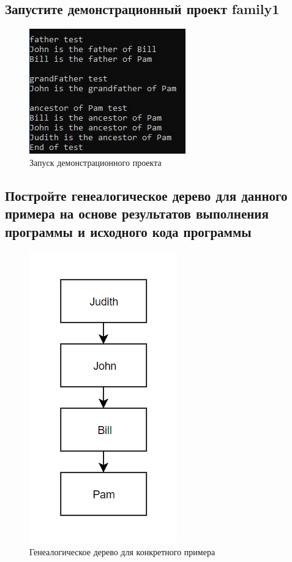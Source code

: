 \documentclass[14pt,a4paper,report]{report}
\begin{document}
\subsection{Запустите демонстрационный проект family1}

\begin{figure}[h!]
	\centering
	\includegraphics[scale = 0.75]{images/1.jpeg}
	\caption{Запуск демонстрационного проекта}
\end{figure}

\subsection{Постройте генеалогическое дерево для данного примера на основе результатов выполнения программы и исходного кода программы}

\begin{figure}[h!]
	\centering
	\includegraphics[scale = 0.65]{images/2.png}
	\caption{Генеалогическое дерево для конкретного примера}
\end{figure}
\end{document}
